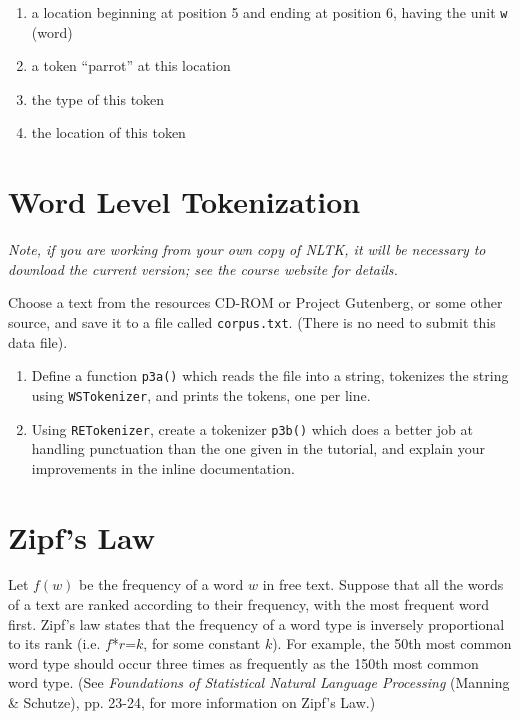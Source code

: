 \documentclass{cis530}
\begin{document}
\begin{enumerate}
    \item a location beginning at position 5 and ending at position 6,
      having the unit \texttt{w} (word)
    \item a token ``parrot'' at this location
    \item the type of this token
    \item the location of this token
\end{enumerate}

\section{Word Level Tokenization}

\textit{Note, if you are working from your own copy of NLTK, it will be
  necessary to download the current version; see the course website for
  details.}

Choose a text from the resources CD-ROM or Project Gutenberg, or some other
source, and save it to a file called \texttt{corpus.txt}.  (There is no need
to submit this data file).

\begin{enumerate}
    \item Define a function \texttt{p3a()} which reads the file into a
      string, tokenizes the string using \texttt{WSTokenizer},
      and prints the tokens, one per line.
    \item Using \texttt{RETokenizer}, create a tokenizer \texttt{p3b()}
      which does a better
      job at handling punctuation than the one given in the tutorial, and
      explain your improvements in the inline documentation.
\end{enumerate}

\section{Zipf's Law}

Let $f(w)$ be the frequency of a word $w$ in free text.  Suppose that
all the words of a text are ranked according to their frequency, with
the most frequent word first.
Zipf's law states that the frequency of a word type is inversely
proportional to its rank (i.e. $f$*$r$=$k$, for some constant $k$).
For example, the 50th most common word type should
occur three times as frequently as the 150th most common word type.
(See \emph{Foundations of Statistical Natural Language Processing}
(Manning \& Schutze), pp. 23-24, for more information on Zipf's Law.)
\end{document}
